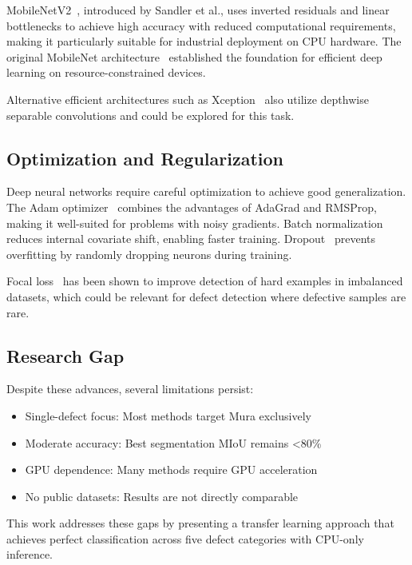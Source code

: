 \documentclass[12pt,a4paper]{article}
\begin{document}
MobileNetV2~\cite{sandler2018mobilenetv2}, introduced by Sandler et al., 
uses inverted residuals and linear bottlenecks to achieve high accuracy 
with reduced computational requirements, making it particularly suitable 
for industrial deployment on CPU hardware. The original MobileNet 
architecture~\cite{howard2017mobilenets} established the foundation 
for efficient deep learning on resource-constrained devices.

Alternative efficient architectures such as Xception~\cite{chollet2017xception} 
also utilize depthwise separable convolutions and could be explored 
for this task.

\subsection{Optimization and Regularization}

Deep neural networks require careful optimization to achieve good 
generalization. The Adam optimizer~\cite{kingma2014adam} combines the 
advantages of AdaGrad and RMSProp, making it well-suited for problems 
with noisy gradients. Batch normalization~\cite{ioffe2015batch} reduces 
internal covariate shift, enabling faster training. Dropout~\cite{srivastava2014dropout} 
prevents overfitting by randomly dropping neurons during training.

Focal loss~\cite{lin2017focal} has been shown to improve detection 
of hard examples in imbalanced datasets, which could be relevant for 
defect detection where defective samples are rare.

\subsection{Research Gap}

Despite these advances, several limitations persist:

\begin{itemize}
\item Single-defect focus: Most methods target Mura exclusively
\item Moderate accuracy: Best segmentation MIoU remains <80\%
\item GPU dependence: Many methods require GPU acceleration
\item No public datasets: Results are not directly comparable
\end{itemize}

This work addresses these gaps by presenting a transfer learning approach 
that achieves perfect classification across five defect categories with 
CPU-only inference.
\end{document}

